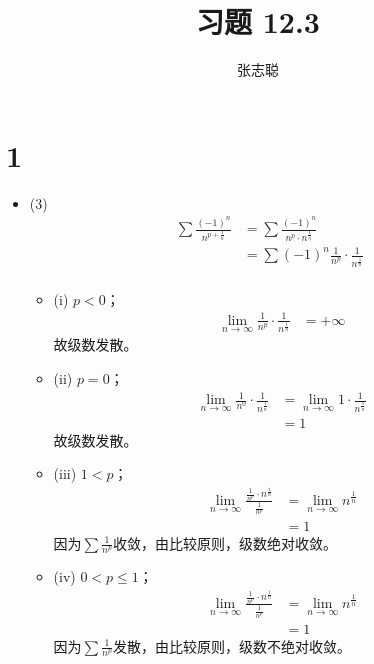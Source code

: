 \documentclass{article}
\begin{document}
\title{习题 12.3}
\author{张志聪}
\maketitle

\section*{1}

\begin{itemize}
  \item (3)
        \begin{align*}
          \sum \frac{(-1)^n}{n^{p + \frac{1}{n}}}
           & = \sum \frac{(-1)^n}{n^p \cdot n^{\frac{1}{n}}}             \\
           & = \sum (-1)^n \frac{1}{n^p} \cdot \frac{1}{n^{\frac{1}{n}}} \\
        \end{align*}

        \begin{itemize}
          \item (i) $p < 0$；
                \begin{align*}
                  \lim\limits_{n \to \infty} \frac{1}{n^p} \cdot \frac{1}{n^{\frac{1}{n}}}
                   & = +\infty
                \end{align*}
                故级数发散。

          \item (ii) $p = 0$；
                \begin{align*}
                  \lim\limits_{n \to \infty} \frac{1}{n^0} \cdot \frac{1}{n^{\frac{1}{n}}}
                   & = \lim\limits_{n \to \infty} 1 \cdot \frac{1}{n^{\frac{1}{n}}} \\
                   & = 1
                \end{align*}
                故级数发散。

          \item (iii) $1 < p$；
                \begin{align*}
                  \lim\limits_{n \to \infty} \frac{\frac{1}{n^p} \cdot n^{\frac{1}{n}}}{\frac{1}{n^p}}
                   & = \lim\limits_{n \to \infty} n^{\frac{1}{n}} \\
                   & = 1
                \end{align*}
                因为$\sum \frac{1}{n^p}$收敛，由比较原则，级数绝对收敛。

          \item (iv) $0 < p \leq 1$；
                \begin{align*}
                  \lim\limits_{n \to \infty} \frac{\frac{1}{n^p} \cdot n^{\frac{1}{n}}}{\frac{1}{n^p}}
                   & = \lim\limits_{n \to \infty} n^{\frac{1}{n}} \\
                   & = 1
                \end{align*}
                因为$\sum \frac{1}{n^p}$发散，由比较原则，级数不绝对收敛。


\end{itemize}
\end{itemize}
\end{document}

